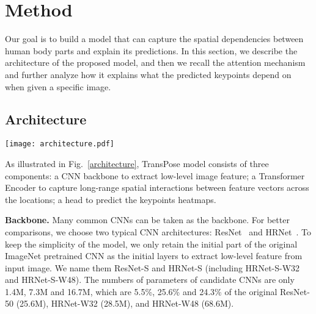 \documentclass{article}
\begin{document}
\section{Method}
Our goal is to build a model that can capture the spatial dependencies between human body parts and explain its predictions.
In this section, we describe the architecture of the proposed model, and then we recall the attention mechanism and further analyze how it explains what the predicted keypoints depend on when given a specific image.
\subsection{Architecture}
\begin{figure*}[t]
 	\begin{center}
\texttt{[image: architecture.pdf]}
 	\end{center}
 	\caption{The TransPose model architecture. Firstly, the feature maps are extracted by a CNN backbone and flattened into a sequence. Next, the Transformer encode layers iteratively capture dependencies from the current sequence by query-key-value attention. Then, a simple head is used to predict the keypoints heatmaps. The model can explain what regions or joints significantly contribute to the predicted locations by the attention maps in Transformer encoder layers, and the spatial dependencies can be further revealed.}\vspace*{-0.1in}
 	\label{architecture}
\end{figure*}

As illustrated in Fig.~\ref{architecture}, TransPose model consists of three components: a CNN backbone to extract low-level image feature; a Transformer Encoder to capture long-range spatial interactions between feature vectors across the locations; a head to predict the keypoints heatmaps.

{\bf Backbone.} Many common CNNs can be taken as the backbone. For better comparisons, we choose two typical CNN architectures: ResNet~\cite{he2016deep} and HRNet~\cite{sun2019hrnet}. To keep the simplicity of the model, we only retain the initial part of the original ImageNet pretrained CNN as the initial layers to extract low-level feature from input image. We name them ResNet-S and HRNet-S (including HRNet-S-W32 and HRNet-S-W48). The numbers of parameters of candidate CNNs are only 1.4M, 7.3M and 16.7M, which are 5.5\%, 25.6\% and 24.3\% of the original ResNet-50 (25.6M), HRNet-W32 (28.5M), and HRNet-W48 (68.6M). 
\end{document}
